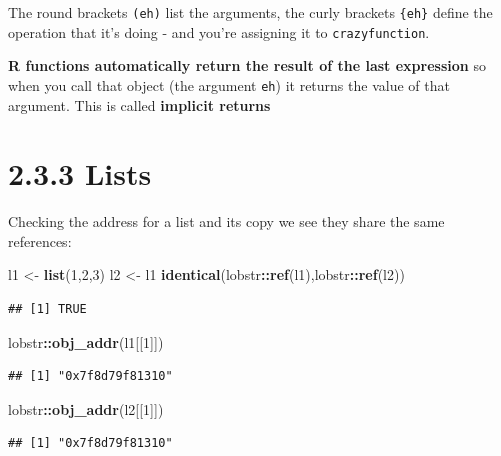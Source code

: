 \documentclass[]{book}
\newenvironment{Shaded}{\begin{snugshade}}{\end{snugshade}}
\newcommand{\DecValTok}[1]{\textcolor[rgb]{0.00,0.00,0.81}{#1}}
\newcommand{\KeywordTok}[1]{\textcolor[rgb]{0.13,0.29,0.53}{\textbf{#1}}}
\newcommand{\NormalTok}[1]{#1}
\newcommand{\OperatorTok}[1]{\textcolor[rgb]{0.81,0.36,0.00}{\textbf{#1}}}
\newcommand{\StringTok}[1]{\textcolor[rgb]{0.31,0.60,0.02}{#1}}
\begin{document}
The round brackets \texttt{(eh)} list the arguments, the curly brackets \texttt{\{eh\}} define the operation that it's doing - and you're assigning it to \texttt{crazyfunction}.

\textbf{R functions automatically return the result of the last expression} so when you call that object (the argument \texttt{eh}) it returns the value of that argument. This is called \textbf{implicit returns}

\hypertarget{lists}{%
\section*{2.3.3 Lists}\label{lists}}

Checking the address for a list and its copy we see they share the same references:

\begin{Shaded}
\begin{Highlighting}[]
\NormalTok{l1 <-}\StringTok{ }\KeywordTok{list}\NormalTok{(}\DecValTok{1}\NormalTok{,}\DecValTok{2}\NormalTok{,}\DecValTok{3}\NormalTok{)}
\NormalTok{l2 <-}\StringTok{ }\NormalTok{l1}
\KeywordTok{identical}\NormalTok{(lobstr}\OperatorTok{::}\KeywordTok{ref}\NormalTok{(l1),lobstr}\OperatorTok{::}\KeywordTok{ref}\NormalTok{(l2))}
\end{Highlighting}
\end{Shaded}

\begin{verbatim}
## [1] TRUE
\end{verbatim}

\begin{Shaded}
\begin{Highlighting}[]
\NormalTok{lobstr}\OperatorTok{::}\KeywordTok{obj_addr}\NormalTok{(l1[[}\DecValTok{1}\NormalTok{]])}
\end{Highlighting}
\end{Shaded}

\begin{verbatim}
## [1] "0x7f8d79f81310"
\end{verbatim}

\begin{Shaded}
\begin{Highlighting}[]
\NormalTok{lobstr}\OperatorTok{::}\KeywordTok{obj_addr}\NormalTok{(l2[[}\DecValTok{1}\NormalTok{]])}
\end{Highlighting}
\end{Shaded}

\begin{verbatim}
## [1] "0x7f8d79f81310"
\end{verbatim}
\end{document}
